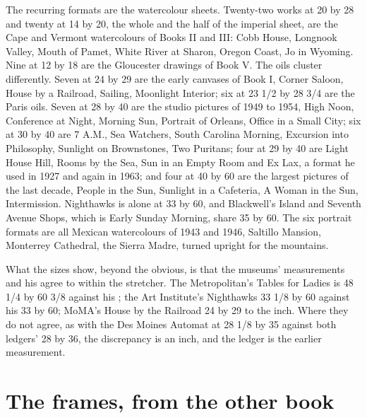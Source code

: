The recurring formats are the watercolour sheets. Twenty-two works at 20 by 28 and twenty at 14 by 20, the whole and the half of the imperial sheet, are the Cape and Vermont watercolours of Books II and III: Cobb House, Longnook Valley, Mouth of Pamet, White River at Sharon, Oregon Coast, Jo in Wyoming. Nine at 12 by 18 are the Gloucester drawings of Book V. The oils cluster differently. Seven at 24 by 29 are the early canvases of Book I, Corner Saloon, House by a Railroad, Sailing, Moonlight Interior; six at 23 1/2 by 28 3/4 are the Paris oils. Seven at 28 by 40 are the studio pictures of 1949 to 1954, High Noon, Conference at Night, Morning Sun, Portrait of Orleans, Office in a Small City; six at 30 by 40 are 7 A.M., Sea Watchers, South Carolina Morning, Excursion into Philosophy, Sunlight on Brownstones, Two Puritans; four at 29 by 40 are Light House Hill, Rooms by the Sea, Sun in an Empty Room and Ex Lax, a format he used in 1927 and again in 1963; and four at 40 by 60 are the largest pictures of the last decade, People in the Sun, Sunlight in a Cafeteria, A Woman in the Sun, Intermission. Nighthawks is alone at 33 by 60, and Blackwell's Island and Seventh Avenue Shops, which is Early Sunday Morning, share 35 by 60. The six portrait formats are all Mexican watercolours of 1943 and 1946, Saltillo Mansion, Monterrey Cathedral, the Sierra Madre, turned upright for the mountains.

What the sizes show, beyond the obvious, is that the museums' measurements and his agree to within the stretcher. The Metropolitan's Tables for Ladies is 48 1/4 by 60 3/8 against his ; the Art Institute's Nighthawks 33 1/8 by 60 against his 33 by 60; MoMA's House by the Railroad 24 by 29 to the inch. Where they do not agree, as with the Des Moines Automat at 28 1/8 by 35 against both ledgers' 28 by 36, the discrepancy is an inch, and the ledger is the earlier measurement.





\section{The frames, from the other book}


